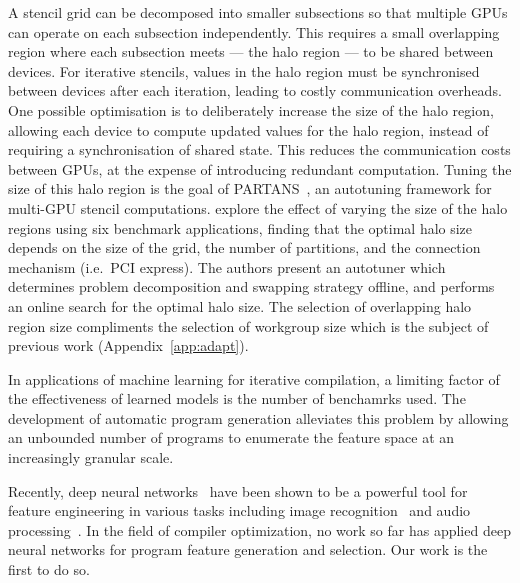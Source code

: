 A stencil grid can be decomposed into smaller subsections so that multiple GPUs can operate on each subsection independently. This requires a small overlapping region where each subsection meets --- the halo region --- to be shared between devices. For iterative stencils, values in the halo region must be synchronised between devices after each iteration, leading to costly communication overheads. One possible optimisation is to deliberately increase the size of the halo region, allowing each device to compute updated values for the halo region, instead of requiring a synchronisation of shared state. This reduces the communication costs between GPUs, at the expense of introducing redundant computation. Tuning the size of this halo region is the goal of PARTANS~\cite{Lutz2013}, an autotuning framework for multi-GPU stencil computations. \citeauthor{Lutz2013} explore the effect of varying the size of the halo regions using six benchmark applications, finding that the optimal halo size depends on the size of the grid, the number of partitions, and the connection mechanism (i.e.\ PCI express). The authors present an autotuner which determines problem decomposition and swapping strategy offline, and performs an online search for the optimal halo size. The selection of overlapping halo region size compliments the selection of workgroup size which is the subject of previous work (Appendix~\ref{app:adapt}).

In applications of machine learning for iterative compilation, a limiting factor of the effectiveness of learned models is the number of benchamrks used. The development of automatic program generation alleviates this problem by allowing an unbounded number of programs to enumerate the feature space at an increasingly granular scale.



Recently, deep neural networks~\cite{LeCun2015} have been shown to be a powerful tool for feature engineering in various tasks including image recognition~\cite{Krizhevsky2012,He2016} and audio processing~\cite{Lee2009b}. In the field of compiler optimization, no work so far has applied deep neural networks for program feature generation and selection. Our work is the first to do so.


